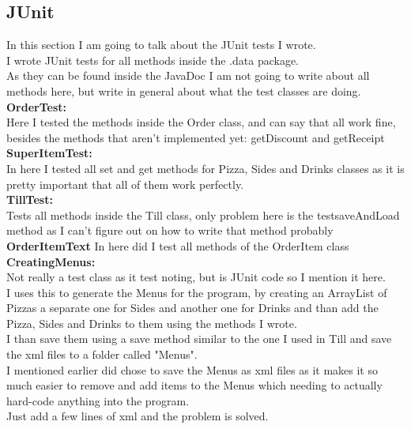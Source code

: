 \documentclass[11pt,a4paper]{article}
\begin{document}
\begin{flushleft}
\section{JUnit}
In this section I am going to talk about the JUnit tests I wrote.\\
I wrote JUnit tests for all methods inside the .data package.\\
As they can be found inside the JavaDoc I am not going to write about all methods here, but write in general about what the test classes are doing.\\
\textbf{OrderTest:}\\
Here I tested the methods inside the Order class, and can say that all work fine, besides the methods that aren't implemented yet: getDiscount and getReceipt\\
\vspace{11pt}
\textbf{SuperItemTest:}\\
In here I tested all set and get methods for Pizza, Sides and Drinks classes as it 
is pretty important that all of them work perfectly.\\
\vspace{11pt}
\textbf{TillTest:}\\
Tests all methods inside the Till class, only problem here is the testsaveAndLoad method as I can't figure out on how to write that method probably\\
\vspace{11pt}
\textbf{OrderItemText}
In here did I test all methods of the OrderItem class\\
\vspace{11pt}
\textbf{CreatingMenus:}\\
Not really a test class as it test noting, but is JUnit code so I mention it here.\\
I uses this to generate the Menus for the program, by creating an ArrayList of Pizzas a separate one for Sides and another one for Drinks and than add the Pizza, Sides and Drinks to them using the methods I wrote.\\
I than save them using a save method similar to the one I used in Till and save the xml files to a folder called "Menus".\\
I mentioned earlier did chose to save the Menus as xml files as it makes it so much easier to remove and add items to the Menus which needing to actually hard-code anything into the program.\\
Just add a few lines of xml and the problem is solved.\\
\pagebreak

\end{flushleft}
\end{document}
